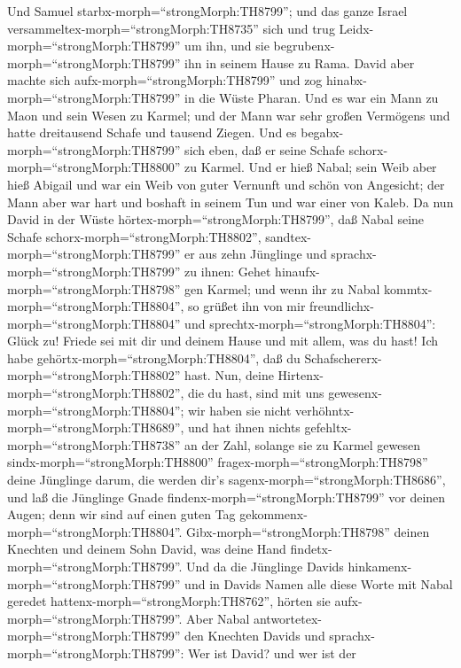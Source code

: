  Und Samuel starbx-morph=``strongMorph:TH8799''; und das
ganze Israel versammeltex-morph=``strongMorph:TH8735'' sich und trug
Leidx-morph=``strongMorph:TH8799'' um ihn, und sie
begrubenx-morph=``strongMorph:TH8799'' ihn in seinem Hause zu Rama.
David aber machte sich aufx-morph=``strongMorph:TH8799'' und zog
hinabx-morph=``strongMorph:TH8799'' in die Wüste Pharan. 
Und es war ein Mann zu Maon und sein Wesen zu Karmel; und der Mann war
sehr großen Vermögens und hatte dreitausend Schafe und tausend Ziegen.
Und es begabx-morph=``strongMorph:TH8799'' sich eben, daß er seine
Schafe schorx-morph=``strongMorph:TH8800'' zu Karmel.  Und
er hieß Nabal; sein Weib aber hieß Abigail und war ein Weib von guter
Vernunft und schön von Angesicht; der Mann aber war hart und boshaft in
seinem Tun und war einer von Kaleb.  Da nun David in der
Wüste hörtex-morph=``strongMorph:TH8799'', daß Nabal seine Schafe
schorx-morph=``strongMorph:TH8802'', 
sandtex-morph=``strongMorph:TH8799'' er aus zehn Jünglinge und
sprachx-morph=``strongMorph:TH8799'' zu ihnen: Gehet
hinaufx-morph=``strongMorph:TH8798'' gen Karmel; und wenn ihr zu Nabal
kommtx-morph=``strongMorph:TH8804'', so grüßet ihn von mir
freundlichx-morph=``strongMorph:TH8804''  und
sprechtx-morph=``strongMorph:TH8804'': Glück zu! Friede sei mit dir und
deinem Hause und mit allem, was du hast!  Ich habe
gehörtx-morph=``strongMorph:TH8804'', daß du
Schafschererx-morph=``strongMorph:TH8802'' hast. Nun, deine
Hirtenx-morph=``strongMorph:TH8802'', die du hast, sind mit uns
gewesenx-morph=``strongMorph:TH8804''; wir haben sie nicht
verhöhntx-morph=``strongMorph:TH8689'', und hat ihnen nichts
gefehltx-morph=``strongMorph:TH8738'' an der Zahl, solange sie zu Karmel
gewesen sindx-morph=``strongMorph:TH8800'' 
fragex-morph=``strongMorph:TH8798'' deine Jünglinge darum, die werden
dir's sagenx-morph=``strongMorph:TH8686'', und laß die Jünglinge Gnade
findenx-morph=``strongMorph:TH8799'' vor deinen Augen; denn wir sind auf
einen guten Tag gekommenx-morph=``strongMorph:TH8804''.
Gibx-morph=``strongMorph:TH8798'' deinen Knechten und deinem Sohn David,
was deine Hand findetx-morph=``strongMorph:TH8799''.  Und da
die Jünglinge Davids hinkamenx-morph=``strongMorph:TH8799'' und in
Davids Namen alle diese Worte mit Nabal geredet
hattenx-morph=``strongMorph:TH8762'', hörten sie
aufx-morph=``strongMorph:TH8799''.  Aber Nabal
antwortetex-morph=``strongMorph:TH8799'' den Knechten Davids und
sprachx-morph=``strongMorph:TH8799'': Wer ist David? und wer ist der
